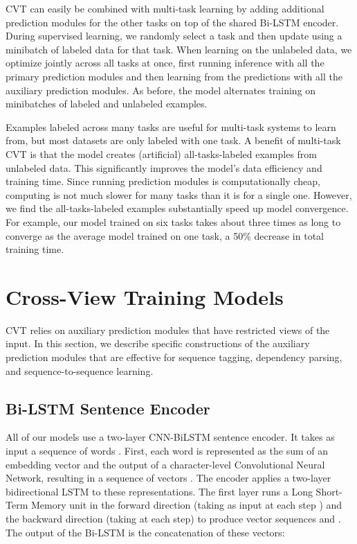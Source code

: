\documentclass[11pt,a4paper]{article}
\begin{document}
CVT can easily be combined with multi-task learning by adding additional prediction modules for the other tasks on top of the shared Bi-LSTM encoder.
During supervised learning, we randomly select a task and then update  using a minibatch of labeled data for that task.
When learning on the unlabeled data, we optimize  jointly across all tasks at once, first running inference with all the primary prediction modules and then learning from the predictions with all the auxiliary prediction modules. 
As before, the model alternates training on minibatches of labeled and unlabeled examples.

Examples labeled across many tasks are useful for multi-task systems to learn from, but most datasets are only labeled with one task. 
A benefit of multi-task CVT is that the model creates (artificial) all-tasks-labeled examples from unlabeled data. 
This significantly improves the model's data efficiency and training time. 
Since running prediction modules is computationally cheap, computing  is not much slower for many tasks than it is for a single one.
However, we find the all-tasks-labeled examples substantially speed up model convergence.
For example, our model trained on six tasks takes about three times as long to converge as the average model trained on one task, a 50\% decrease in total training time. 




\section{Cross-View Training Models}
\label{sec:models}

CVT relies on auxiliary prediction modules that have restricted views of the input. In this section, we describe specific constructions of the auxiliary prediction modules that are effective for sequence tagging, dependency parsing, and sequence-to-sequence learning.

\subsection{Bi-LSTM Sentence Encoder}
All of our models use a two-layer CNN-BiLSTM \citep{chiu2015named,ma2016end} sentence encoder. 
It takes as input a sequence of words .
First, each word is represented as the sum of an embedding vector and the output of a character-level Convolutional Neural Network, resulting in a sequence of vectors .
The encoder applies a two-layer bidirectional LSTM \citep{graves2005framewise} to these representations. The first layer runs a Long Short-Term Memory unit \citep{hochreiter1997long} in the forward direction (taking  as input at each step ) and the backward direction (taking  at each step) to produce vector sequences  and . The output of the Bi-LSTM is the concatenation of these vectors:
\end{document}
